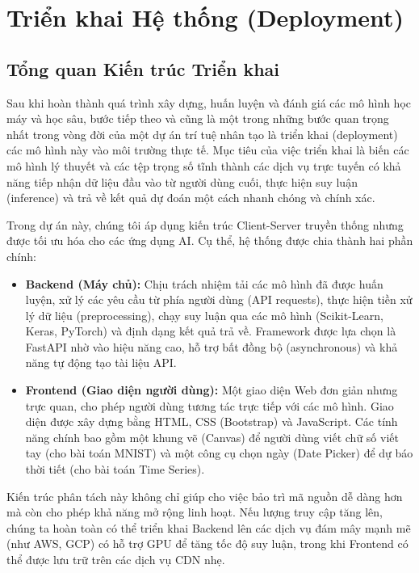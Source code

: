 \documentclass[12pt,a4paper]{article}
\begin{document}

\newpage
\section{Triển khai Hệ thống (Deployment)}

\subsection{Tổng quan Kiến trúc Triển khai}
Sau khi hoàn thành quá trình xây dựng, huấn luyện và đánh giá các mô hình học máy và học sâu, bước tiếp theo và cũng là một trong những bước quan trọng nhất trong vòng đời của một dự án trí tuệ nhân tạo là triển khai (deployment) các mô hình này vào môi trường thực tế. Mục tiêu của việc triển khai là biến các mô hình lý thuyết và các tệp trọng số tĩnh thành các dịch vụ trực tuyến có khả năng tiếp nhận dữ liệu đầu vào từ người dùng cuối, thực hiện suy luận (inference) và trả về kết quả dự đoán một cách nhanh chóng và chính xác. 

Trong dự án này, chúng tôi áp dụng kiến trúc Client-Server truyền thống nhưng được tối ưu hóa cho các ứng dụng AI. Cụ thể, hệ thống được chia thành hai phần chính:
\begin{itemize}
    \item \textbf{Backend (Máy chủ):} Chịu trách nhiệm tải các mô hình đã được huấn luyện, xử lý các yêu cầu từ phía người dùng (API requests), thực hiện tiền xử lý dữ liệu (preprocessing), chạy suy luận qua các mô hình (Scikit-Learn, Keras, PyTorch) và định dạng kết quả trả về. Framework được lựa chọn là FastAPI nhờ vào hiệu năng cao, hỗ trợ bất đồng bộ (asynchronous) và khả năng tự động tạo tài liệu API.
    \item \textbf{Frontend (Giao diện người dùng):} Một giao diện Web đơn giản nhưng trực quan, cho phép người dùng tương tác trực tiếp với các mô hình. Giao diện được xây dựng bằng HTML, CSS (Bootstrap) và JavaScript. Các tính năng chính bao gồm một khung vẽ (Canvas) để người dùng viết chữ số viết tay (cho bài toán MNIST) và một công cụ chọn ngày (Date Picker) để dự báo thời tiết (cho bài toán Time Series).
\end{itemize}

Kiến trúc phân tách này không chỉ giúp cho việc bảo trì mã nguồn dễ dàng hơn mà còn cho phép khả năng mở rộng linh hoạt. Nếu lượng truy cập tăng lên, chúng ta hoàn toàn có thể triển khai Backend lên các dịch vụ đám mây mạnh mẽ (như AWS, GCP) có hỗ trợ GPU để tăng tốc độ suy luận, trong khi Frontend có thể được lưu trữ trên các dịch vụ CDN nhẹ.
\end{document}

